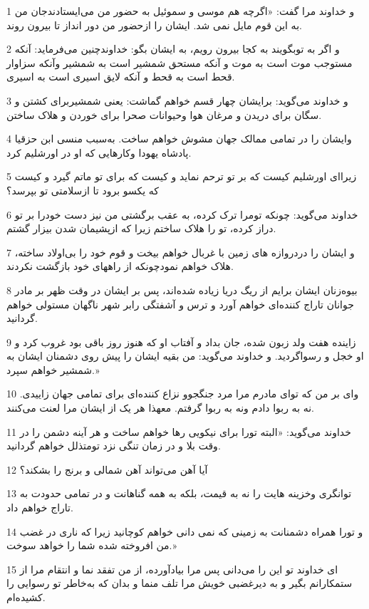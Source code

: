 \par 1 و خداوند مرا گفت: «اگر‌چه هم موسی و سموئیل به حضور من می‌ایستادندجان من به این قوم مایل نمی شد. ایشان را ازحضور من دور انداز تا بیرون روند.
\par 2 و اگر به توبگویند به کجا بیرون رویم، به ایشان بگو: خداوندچنین می‌فرماید: آنکه مستوجب موت است به موت و آنکه مستحق شمشیر است به شمشیر وآنکه سزاوار قحط است به قحط و آنکه لایق اسیری است به اسیری.
\par 3 و خداوند می‌گوید: برایشان چهار قسم خواهم گماشت: یعنی شمشیربرای کشتن و سگان برای دریدن و مرغان هوا وحیوانات صحرا برای خوردن و هلاک ساختن.
\par 4 وایشان را در تمامی ممالک جهان مشوش خواهم ساخت. به‌سبب منسی ابن حزقیا پادشاه یهودا وکارهایی که او در اورشلیم کرد.
\par 5 زیرا‌ای اورشلیم کیست که بر تو ترحم نماید و کیست که برای تو ماتم گیرد و کیست که یکسو برود تا ازسلامتی تو بپرسد؟
\par 6 خداوند می‌گوید: چونکه تومرا ترک کرده، به عقب برگشتی من نیز دست خودرا بر تو دراز کرده، تو را هلاک ساختم زیرا که ازپشیمان شدن بیزار گشتم.
\par 7 و ایشان را دردروازه های زمین با غربال خواهم بیخت و قوم خود را بی‌اولاد ساخته، هلاک خواهم نمودچونکه از راههای خود بازگشت نکردند.
\par 8 بیوه‌زنان ایشان برایم از ریگ دریا زیاده شده‌اند، پس بر ایشان در وقت ظهر بر مادر جوانان تاراج کننده‌ای خواهم آورد و ترس و آشفتگی رابر شهر ناگهان مستولی خواهم گردانید.
\par 9 زاینده هفت ولد زبون شده، جان بداد و آفتاب او که هنوز روز باقی بود غروب کرد و او خجل و رسواگردید. و خداوند می‌گوید: من بقیه ایشان را پیش روی دشمنان ایشان به شمشیر خواهم سپرد.»
\par 10 وای بر من که تو‌ای مادرم مرا مرد جنگجوو نزاع کننده‌ای برای تمامی جهان زاییدی. نه به ربوا دادم ونه به ربوا گرفتم. معهذا هر یک از ایشان مرا لعنت می‌کنند.
\par 11 خداوند می‌گوید: «البته تورا برای نیکویی رها خواهم ساخت و هر آینه دشمن را در وقت بلا و در زمان تنگی نزد تومتذلل خواهم گردانید.
\par 12 آیا آهن می‌تواند آهن شمالی و برنج را بشکند؟
\par 13 توانگری وخزینه هایت را نه به قیمت، بلکه به همه گناهانت و در تمامی حدودت به تاراج خواهم داد.
\par 14 و تورا همراه دشمنانت به زمینی که نمی دانی خواهم کوچانید زیرا که ناری در غضب من افروخته شده شما را خواهد سوخت.»
\par 15 ‌ای خداوند تو این را می‌دانی پس مرا بیادآورده، از من تفقد نما و انتقام مرا از ستمکارانم بگیر و به دیرغضبی خویش مرا تلف منما و بدان که به‌خاطر تو رسوایی را کشیده‌ام.
